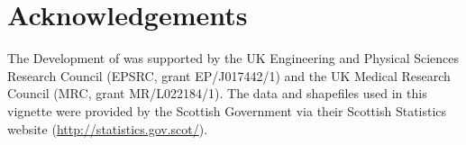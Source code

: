 \documentclass[article, nojss]{jss}
\begin{document}
\section{Acknowledgements}
The Development of  was supported by the UK Engineering and Physical Sciences Research Council (EPSRC, grant EP/J017442/1) and the UK Medical Research Council (MRC, grant MR/L022184/1). The data and shapefiles used in this vignette were provided by the Scottish Government via their Scottish Statistics website (\url{http://statistics.gov.scot/}).



\end{document}
